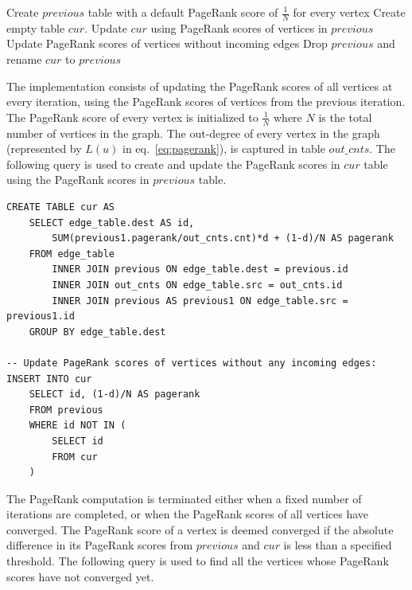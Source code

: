 \begin{algorithm}[PageRank$(V,E)$] \label{alg:pagerank:high}
\begin{algorithmic}[1]
    \State Create $previous$ table with a default PageRank score of
            $\frac{1}{N}$ for every vertex
    \Repeat
        \State Create empty table $cur$.
        \State Update $cur$ using PageRank scores of vertices in $previous$
        \State Update PageRank scores of vertices without incoming edges
        \State Drop $previous$ and rename $cur$ to $previous$
\end{algorithmic}
\end{algorithm}

The implementation consists of updating the PageRank scores of all vertices
at every iteration, using the PageRank scores of vertices from the previous
iteration. The PageRank score of every vertex is initialized to $\frac{1}{N}$
where $N$ is the total number of vertices in the graph. The out-degree of
every vertex in the graph (represented by $L(u)$ in eq.~\ref{eq:pagerank}),
is captured in table $out\_cnts$. The following query is used to create and
update the PageRank scores in $cur$ table using the PageRank scores in
$previous$ table.

\begin{algorithm}
\label{alg:pagerank:update}
\begin{lstlisting}
CREATE TABLE cur AS
    SELECT edge_table.dest AS id,
        SUM(previous1.pagerank/out_cnts.cnt)*d + (1-d)/N AS pagerank
    FROM edge_table
        INNER JOIN previous ON edge_table.dest = previous.id
        INNER JOIN out_cnts ON edge_table.src = out_cnts.id
        INNER JOIN previous AS previous1 ON edge_table.src = previous1.id
    GROUP BY edge_table.dest

-- Update PageRank scores of vertices without any incoming edges:
INSERT INTO cur
    SELECT id, (1-d)/N AS pagerank
    FROM previous
    WHERE id NOT IN (
        SELECT id
        FROM cur
    )
\end{lstlisting}
\end{algorithm}

The PageRank computation is terminated either when a fixed number of iterations
are completed, or when the PageRank scores of all vertices have converged. The
PageRank score of a vertex is deemed converged if the absolute difference in
its PageRank scores from $previous$ and $cur$ is less than a specified threshold.
The following query is used to find all the vertices whose PageRank scores have
not converged yet.

